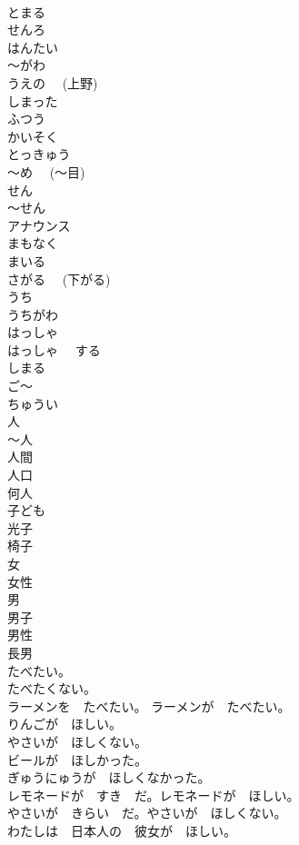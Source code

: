 \documentclass[8pt]{extreport}
\begin{document}
\begin{CJK}{UTF8}{min}
\\	とまる	
\\	せんろ	
\\	はんたい	
\\	～がわ	
\\	うえの　 (上野)	
\\	しまった	
\\	ふつう	
\\	かいそく	
\\	とっきゅう	
\\	～め　 (～目)	
\\	せん	
\\	～せん	
\\	アナウンス	
\\	まもなく	
\\	まいる	
\\	さがる　 (下がる)	
\\	うち	
\\	うちがわ	
\\	はっしゃ	
\\	はっしゃ　 する	
\\	しまる	
\\	ご～	
\\	ちゅうい	
\\	人	
\\	～人	
\\	人間	
\\	人口	
\\	何人	
\\	子ども	
\\	光子	
\\	椅子	
\\	女	
\\	女性	
\\	男	
\\	男子	
\\	男性	
\\	長男	
\\	たべたい。	
\\	たべたくない。	
\\	ラーメンを　たべたい。 ラーメンが　たべたい。	
\\	りんごが　ほしい。	
\\	やさいが　ほしくない。	
\\	ビールが　ほしかった。	
\\	ぎゅうにゅうが　ほしくなかった。	
\\	レモネードが　すき　だ。レモネードが　ほしい。	
\\	やさいが　きらい　だ。やさいが　ほしくない。	
\\	わたしは　日本人の　彼女が　ほしい。	

\end{CJK}
\end{document}
